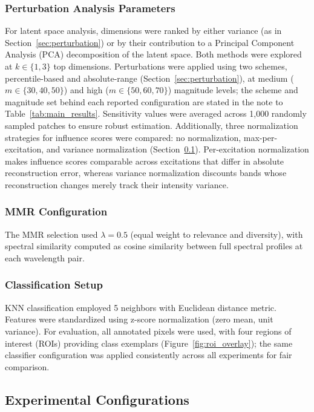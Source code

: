 \subsubsection{Perturbation Analysis Parameters}
For latent space analysis, dimensions were ranked by either variance (as in Section~\ref{sec:perturbation}) or by their contribution to a Principal Component Analysis (PCA) decomposition of the latent space.
Both methods were explored at $k \in \{1, 3\}$ top dimensions. Perturbations were applied using two schemes, percentile-based and absolute-range (Section~\ref{sec:perturbation}), at medium ($m \in \{30, 40, 50\}$) and high ($m \in \{50, 60, 70\}$) magnitude levels; the scheme and magnitude set behind each reported configuration are stated in the note to Table~\ref{tab:main_results}.
Sensitivity values were averaged across 1,000 randomly sampled patches to ensure robust estimation.
Additionally, three normalization strategies for influence scores were compared: no normalization, max-per-excitation, and variance normalization (Section~\ref{sec:configurations}).
Per-excitation normalization makes influence scores comparable across excitations that differ in absolute reconstruction error, whereas variance normalization discounts bands whose reconstruction changes merely track their intensity variance.

\subsubsection{MMR Configuration}
The MMR selection used $\lambda = 0.5$ (equal weight to relevance and diversity), with spectral similarity computed as cosine similarity between full spectral profiles at each wavelength pair.

\subsubsection{Classification Setup}
KNN classification employed 5 neighbors with Euclidean distance metric.
Features were standardized using z-score normalization (zero mean, unit variance).
For evaluation, all annotated pixels were used, with four regions of interest (ROIs) providing class exemplars (Figure~\ref{fig:roi_overlay}); the same classifier configuration was applied consistently across all experiments for fair comparison.

\subsection{Experimental Configurations}
\label{sec:configurations}


